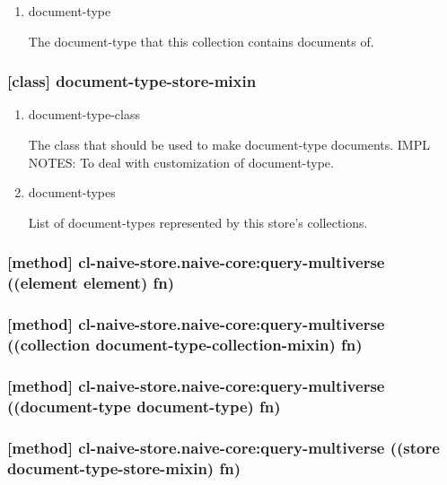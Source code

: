 \documentclass[11pt]{article}
\begin{document}
\begin{enumerate}
\item\relax [accessor] document-type
\label{sec:orgdcf7acb}

The document-type that this collection contains documents of.
\end{enumerate}


\subsubsection{[class] document-type-store-mixin}
\label{sec:org5483b9d}

\begin{enumerate}
\item\relax [accessor] document-type-class
\label{sec:orga1f39d4}

The class that should be used to make document-type documents.
IMPL NOTES: To deal with customization of document-type.

\item\relax [accessor] document-types
\label{sec:org9306a46}

List of document-types represented by this store's collections.
\end{enumerate}

\subsubsection{[method] cl-naive-store.naive-core:query-multiverse ((element element) fn)}
\label{sec:org3c68980}

\subsubsection{[method] cl-naive-store.naive-core:query-multiverse ((collection document-type-collection-mixin) fn)}
\label{sec:orgbc388fa}

\subsubsection{[method] cl-naive-store.naive-core:query-multiverse ((document-type document-type) fn)}
\label{sec:org9e6e0fe}

\subsubsection{[method] cl-naive-store.naive-core:query-multiverse ((store document-type-store-mixin) fn)}
\label{sec:orgd1ca511}
\end{document}
